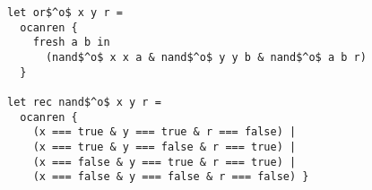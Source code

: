 \begin{lstlisting}
let or$^o$ x y r =
  ocanren {
    fresh a b in
      (nand$^o$ x x a & nand$^o$ y y b & nand$^o$ a b r)
  }

let rec nand$^o$ x y r =
  ocanren {
    (x === true & y === true & r === false) |
    (x === true & y === false & r === true) |
    (x === false & y === true & r === true) |
    (x === false & y === false & r === false) }
\end{lstlisting}